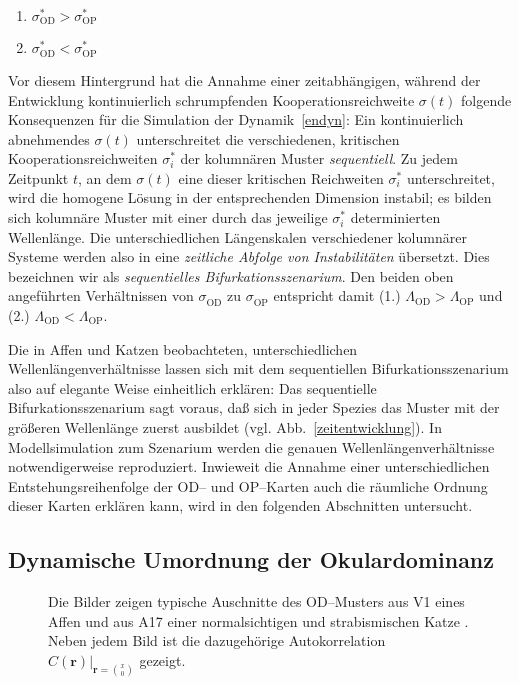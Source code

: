 \begin{enumerate}
\item $\sigma_{\text{OD}}^\ast > \sigma_{\text{OP}}^\ast$
\item $\sigma_{\text{OD}}^\ast < \sigma_{\text{OP}}^\ast$
\end{enumerate}

Vor diesem Hintergrund hat die Annahme einer zeitabhängigen, während der
Entwicklung kontinuierlich schrumpfenden Kooperationsreichweite $\sigma(t)$
folgende Konsequenzen für die Simulation der Dynamik~\eqref{endyn}: Ein
kontinuierlich abnehmendes $\sigma(t)$ unterschreitet die verschiedenen,
kritischen Kooperationsreichweiten $\sigma_i^\ast$ der
kolumnären Muster \emph{sequentiell}. Zu jedem Zeitpunkt $t$, an dem
$\sigma(t)$ eine dieser kritischen Reichweiten $\sigma_i^\ast$
unterschreitet, wird die homogene Lösung in der entsprechenden Dimension
instabil; es bilden sich kolumnäre Muster mit einer durch das jeweilige
$\sigma_i^\ast$ determinierten Wellenlänge.  Die unterschiedlichen
Längenskalen verschiedener kolumnärer Systeme werden also in eine
\emph{zeitliche Abfolge von Instabilitäten} übersetzt. Dies bezeichnen
wir als \emph{sequentielles Bifurkationsszenarium}.  Den beiden oben
angeführten Verhältnissen von $\sigma_{\text{OD}}^{\phantom{\ast}}$ zu
$\sigma_{\text{OP}}^{\phantom{\ast}}$ entspricht damit (1.)
$\Lambda_{\text{OD}} > \Lambda_{\text{OP}}$ und (2.) $\Lambda_{\text{OD}} <
\Lambda_{\text{OP}}$.

Die in Affen und Katzen beobachteten, unterschiedlichen
Wellenlängenverhältnisse lassen sich mit dem sequentiellen
Bifurkationsszenarium also auf elegante Weise einheitlich erklären: Das
sequentielle Bifurkationsszenarium sagt voraus, daß sich in jeder Spezies
das Muster mit der größeren Wellenlänge zuerst ausbildet
(vgl. Abb.~\ref{zeitentwicklung}). In Modellsimulation zum Szenarium
werden die genauen Wellenlängenverhältnisse notwendigerweise
reproduziert.  Inwieweit die Annahme einer unterschiedlichen
Entstehungsreihenfolge der OD-- und OP--Karten auch die räumliche Ordnung
dieser Karten erklären kann, wird in den folgenden Abschnitten untersucht.

\subsection{Dynamische Umordnung der Okulardominanz}
\label{odord}

\begin{figure}[t]
\begin{center}
\end{center}
\caption{Die Bilder zeigen typische Auschnitte des OD--Musters aus V1 eines
Affen \protect{} und aus A17 einer normalsichtigen und strabismischen Katze
\protect{}. Neben jedem Bild ist die dazugehörige Autokorrelation
$C(\mathbf{r})\vert_{\mathbf{r}={\binom{x}{0}}}$ gezeigt.}
\label{odcorr}
\end{figure}

